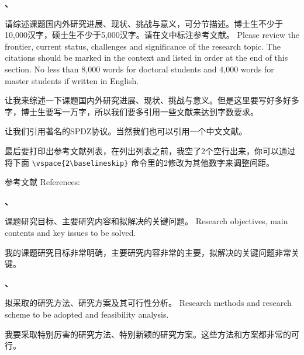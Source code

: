 \documentclass[zihao=-4,a4paper]{ctexart}
\newcounter{field}
\newenvironment{field}
    {\vspace{12pt}\bfseries\noindent\stepcounter{field}\thefield 、\begin{minipage}[t]{\linewidth-24pt}}
    {\end{minipage}\vspace{12pt}}
\newenvironment{content}{\kaishu}{}
\begin{document}

\begin{field}
    请综述课题国内外研究进展、现状、挑战与意义，可分节描述。博士生不少于10,000汉字，硕士生不少于5,000汉字。请在文中标注参考文献。 
    Please review the frontier, current status, challenges and significance of the research topic. The citations should be marked in the context and listed in order at the end of this section. No less than 8,000 words for doctoral students and 4,000 words for master students if written in English.
\end{field}

\begin{content}
    让我来综述一下课题国内外研究进展、现状、挑战与意义。但是这里要写好多好多字，博士生要写一万字，所以我们要多引用一些文献来达到字数要求。

    让我们引用著名的SPDZ协议\cite{SPDZ}。当然我们也可以引用一个中文文献\cite{ZJSD}。

    最后要打印出参考文献列表，在列出列表之前，我空了2个空行出来，你可以通过将下面 \verb|\vspace{2\baselineskip}| 命令里的2修改为其他数字来调整间距。

    \vspace{2\baselineskip}
    参考文献 References: 
    \printbibliography[heading=none]
\end{content}


\begin{field}
    课题研究目标、主要研究内容和拟解决的关键问题。 
    Research objectives, main contents and key issues to be solved.
\end{field}

\begin{content}
    我的课题研究目标非常明确，主要研究内容非常的主要，拟解决的关键问题非常关键。
\end{content}


\begin{field}
    拟采取的研究方法、研究方案及其可行性分析。
    Research methods and research scheme to be adopted and feasibility analysis.
\end{field}

\begin{content}
    我要采取特别厉害的研究方法、特别新颖的研究方案。这些方法和方案都非常的可行。
\end{content}
\end{document}
